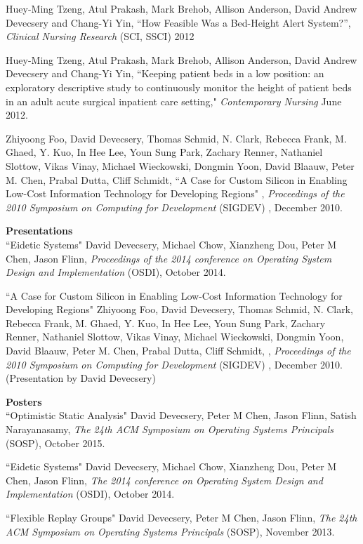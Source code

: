 \documentclass[margin, 10pt]{res} %
\begin{document}
\begin{resume}
Huey-Ming Tzeng, Atul Prakash, Mark Brehob, Allison Anderson, David
Andrew Devecsery and Chang-Yi Yin, ``How Feasible Was a Bed-Height
Alert System?”, {\sl Clinical Nursing Research} (SCI, SSCI) 2012

Huey-Ming Tzeng, Atul Prakash, Mark Brehob, Allison Anderson, David
Andrew Devecsery and Chang-Yi Yin, ``Keeping patient beds in a low
position: an exploratory descriptive study to continuously monitor the
height of patient beds in an adult acute surgical inpatient care
setting," {\sl Contemporary Nursing} June 2012.

Zhiyoong Foo, David Devecsery, Thomas Schmid, N. Clark, Rebecca Frank,
M. Ghaed, Y. Kuo, In Hee Lee, Youn Sung Park, Zachary Renner,
Nathaniel Slottow, Vikas Vinay, Michael Wieckowski, Dongmin Yoon,
David Blaauw, Peter M. Chen, Prabal Dutta, Cliff Schmidt, ``A Case for
Custom Silicon in Enabling Low-Cost Information Technology for
Developing Regions" , {\sl Proceedings of the 2010 Symposium on Computing
for Development} (SIGDEV) , December 2010.

\textbf{Presentations}\\
``Eidetic Systems" David Devecsery, Michael Chow, Xianzheng Dou,
Peter M Chen, Jason Flinn, {\sl Proceedings of the 2014 conference
on Operating System Design and Implementation} (OSDI), October 2014.

``A Case for Custom Silicon in Enabling Low-Cost Information
Technology for Developing Regions" Zhiyoong Foo, David Devecsery,
Thomas Schmid, N. Clark, Rebecca Frank, M. Ghaed, Y. Kuo, In Hee Lee,
Youn Sung Park, Zachary Renner, Nathaniel Slottow, Vikas Vinay,
Michael Wieckowski, Dongmin Yoon, David Blaauw, Peter M. Chen, Prabal
Dutta, Cliff Schmidt,  , {\sl Proceedings of the 2010 Symposium on
Computing for Development} (SIGDEV) , December 2010. (Presentation by
David Devecsery)

\textbf{Posters}\\
``Optimistic Static Analysis" David Devecsery, Peter M Chen, Jason
Flinn, Satish Narayanasamy, {\sl The 24th ACM Symposium on Operating Systems
Principals} (SOSP), October 2015.

``Eidetic Systems" David Devecsery, Michael Chow, Xianzheng Dou,
Peter M Chen, Jason Flinn, {\sl The 2014 conference
on Operating System Design and Implementation} (OSDI), October 2014.

``Flexible Replay Groups" David Devecsery, Peter M Chen, Jason Flinn,
{\sl The 24th ACM Symposium on Operating Systems
Principals} (SOSP), November 2013.


\end{resume}
\end{document}
